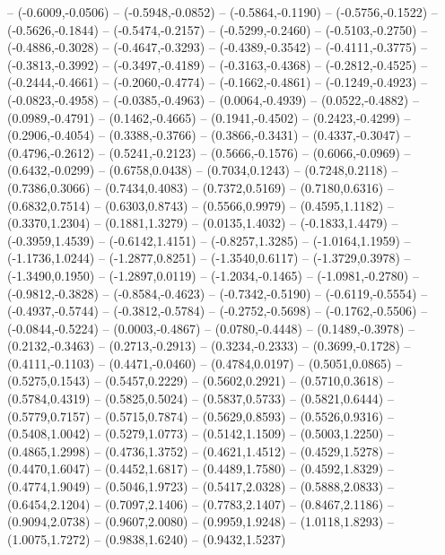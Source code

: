 {	-- (-0.6009,-0.0506)
	-- (-0.5948,-0.0852)
	-- (-0.5864,-0.1190)
	-- (-0.5756,-0.1522)
	-- (-0.5626,-0.1844)
	-- (-0.5474,-0.2157)
	-- (-0.5299,-0.2460)
	-- (-0.5103,-0.2750)
	-- (-0.4886,-0.3028)
	-- (-0.4647,-0.3293)
	-- (-0.4389,-0.3542)
	-- (-0.4111,-0.3775)
	-- (-0.3813,-0.3992)
	-- (-0.3497,-0.4189)
	-- (-0.3163,-0.4368)
	-- (-0.2812,-0.4525)
	-- (-0.2444,-0.4661)
	-- (-0.2060,-0.4774)
	-- (-0.1662,-0.4861)
	-- (-0.1249,-0.4923)
	-- (-0.0823,-0.4958)
	-- (-0.0385,-0.4963)
	-- (0.0064,-0.4939)
	-- (0.0522,-0.4882)
	-- (0.0989,-0.4791)
	-- (0.1462,-0.4665)
	-- (0.1941,-0.4502)
	-- (0.2423,-0.4299)
	-- (0.2906,-0.4054)
	-- (0.3388,-0.3766)
	-- (0.3866,-0.3431)
	-- (0.4337,-0.3047)
	-- (0.4796,-0.2612)
	-- (0.5241,-0.2123)
	-- (0.5666,-0.1576)
	-- (0.6066,-0.0969)
	-- (0.6432,-0.0299)
	-- (0.6758,0.0438)
	-- (0.7034,0.1243)
	-- (0.7248,0.2118)
	-- (0.7386,0.3066)
	-- (0.7434,0.4083)
	-- (0.7372,0.5169)
	-- (0.7180,0.6316)
	-- (0.6832,0.7514)
	-- (0.6303,0.8743)
	-- (0.5566,0.9979)
	-- (0.4595,1.1182)
	-- (0.3370,1.2304)
	-- (0.1881,1.3279)
	-- (0.0135,1.4032)
	-- (-0.1833,1.4479)
	-- (-0.3959,1.4539)
	-- (-0.6142,1.4151)
	-- (-0.8257,1.3285)
	-- (-1.0164,1.1959)
	-- (-1.1736,1.0244)
	-- (-1.2877,0.8251)
	-- (-1.3540,0.6117)
	-- (-1.3729,0.3978)
	-- (-1.3490,0.1950)
	-- (-1.2897,0.0119)
	-- (-1.2034,-0.1465)
	-- (-1.0981,-0.2780)
	-- (-0.9812,-0.3828)
	-- (-0.8584,-0.4623)
	-- (-0.7342,-0.5190)
	-- (-0.6119,-0.5554)
	-- (-0.4937,-0.5744)
	-- (-0.3812,-0.5784)
	-- (-0.2752,-0.5698)
	-- (-0.1762,-0.5506)
	-- (-0.0844,-0.5224)
	-- (0.0003,-0.4867)
	-- (0.0780,-0.4448)
	-- (0.1489,-0.3978)
	-- (0.2132,-0.3463)
	-- (0.2713,-0.2913)
	-- (0.3234,-0.2333)
	-- (0.3699,-0.1728)
	-- (0.4111,-0.1103)
	-- (0.4471,-0.0460)
	-- (0.4784,0.0197)
	-- (0.5051,0.0865)
	-- (0.5275,0.1543)
	-- (0.5457,0.2229)
	-- (0.5602,0.2921)
	-- (0.5710,0.3618)
	-- (0.5784,0.4319)
	-- (0.5825,0.5024)
	-- (0.5837,0.5733)
	-- (0.5821,0.6444)
	-- (0.5779,0.7157)
	-- (0.5715,0.7874)
	-- (0.5629,0.8593)
	-- (0.5526,0.9316)
	-- (0.5408,1.0042)
	-- (0.5279,1.0773)
	-- (0.5142,1.1509)
	-- (0.5003,1.2250)
	-- (0.4865,1.2998)
	-- (0.4736,1.3752)
	-- (0.4621,1.4512)
	-- (0.4529,1.5278)
	-- (0.4470,1.6047)
	-- (0.4452,1.6817)
	-- (0.4489,1.7580)
	-- (0.4592,1.8329)
	-- (0.4774,1.9049)
	-- (0.5046,1.9723)
	-- (0.5417,2.0328)
	-- (0.5888,2.0833)
	-- (0.6454,2.1204)
	-- (0.7097,2.1406)
	-- (0.7783,2.1407)
	-- (0.8467,2.1186)
	-- (0.9094,2.0738)
	-- (0.9607,2.0080)
	-- (0.9959,1.9248)
	-- (1.0118,1.8293)
	-- (1.0075,1.7272)
	-- (0.9838,1.6240)
	-- (0.9432,1.5237)
}
\def\scaleE{0.6574}
